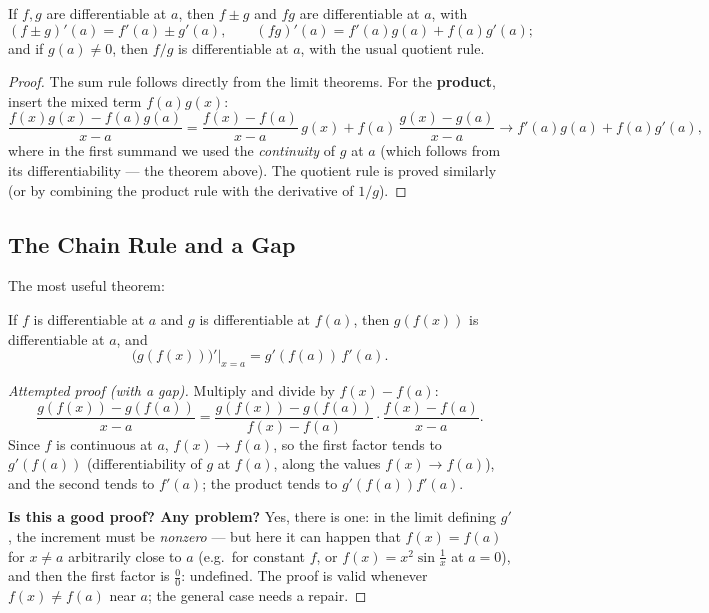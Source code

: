 \documentclass[11pt]{report}
\begin{document}
\begin{thmbox}
If $f, g$ are differentiable at $a$, then $f \pm g$ and $fg$ are differentiable at $a$, with
\[
(f \pm g)'(a) = f'(a) \pm g'(a), \qquad (fg)'(a) = f'(a) g(a) + f(a) g'(a);
\]
and if $g(a) \neq 0$, then $f/g$ is differentiable at $a$, with the usual quotient rule.
\end{thmbox}

\begin{proof}
The sum rule follows directly from the limit theorems. For the \textbf{product}, insert the mixed term $f(a)g(x)$:
\[
\frac{f(x)g(x) - f(a)g(a)}{x-a}
= \frac{f(x) - f(a)}{x-a}\, g(x) + f(a)\, \frac{g(x) - g(a)}{x-a}
\longrightarrow f'(a) g(a) + f(a) g'(a),
\]
where in the first summand we used the \emph{continuity} of $g$ at $a$ (which follows from its differentiability --- the theorem above). The quotient rule is proved similarly (or by combining the product rule with the derivative of $1/g$).
\end{proof}

\subsection{The Chain Rule and a Gap}

The most useful theorem:

\begin{thmbox}
If $f$ is differentiable at $a$ and $g$ is differentiable at $f(a)$, then $g(f(x))$ is differentiable at $a$, and
\[
\bigl( g(f(x)) \bigr)'\big|_{x=a} = g'(f(a))\, f'(a).
\]
\end{thmbox}

\begin{proof}[Attempted proof (with a gap)]
Multiply and divide by $f(x) - f(a)$:
\[
\frac{g(f(x)) - g(f(a))}{x - a} = \frac{g(f(x)) - g(f(a))}{f(x) - f(a)} \cdot \frac{f(x) - f(a)}{x - a}.
\]
Since $f$ is continuous at $a$, $f(x) \to f(a)$, so the first factor tends to $g'(f(a))$ (differentiability of $g$ at $f(a)$, along the values $f(x) \to f(a)$), and the second tends to $f'(a)$; the product tends to $g'(f(a)) f'(a)$.

\textbf{Is this a good proof? Any problem?} Yes, there is one: in the limit defining $g'$, the increment must be \emph{nonzero} --- but here it can happen that $f(x) = f(a)$ for $x \neq a$ arbitrarily close to $a$ (e.g.\ for constant $f$, or $f(x) = x^2\sin\tfrac1x$ at $a = 0$), and then the first factor is $\tfrac00$: undefined. The proof is valid whenever $f(x) \neq f(a)$ near $a$; the general case needs a repair.
\end{proof}
\end{document}
